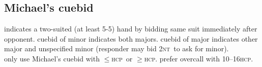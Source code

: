 \documentclass[landscape]{article}
\newcommand{\optionalmath}[1]{\ifmmode#1\else$#1$\fi}
\let\mathge\ge
\let\mathle\le
\def\ge{\optionalmath\mathge}
\def\le{\optionalmath\mathle}
\def\NT{\ifmmode\mathsc{nt}\else\textsc{nt}\fi}
\def\HCP{\textsc{hcp}}
\begin{document}
\begin{minipage}[t]{.33\columnwidth}
\subsection{Michael's cuebid}
indicates a two-suited (at least 5-5) hand by bidding same
suit immediately after opponent.  cuebid of minor indicates
both majors.  cuebid of major indicates other major and
unspecified minor (responder may bid 2\NT\ to ask for minor).\\

only use Michael's cuebid with \le 9\HCP\ or \ge 16\HCP.
prefer overcall with 10--16\HCP.

\end{minipage}
\end{document}
